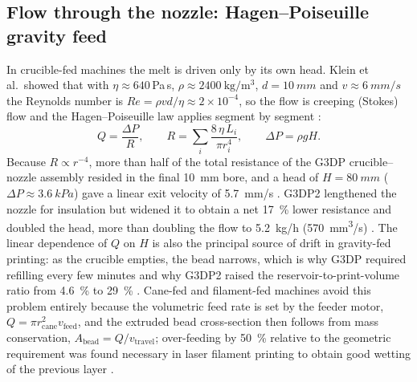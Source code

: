\subsection{Flow through the nozzle: Hagen--Poiseuille gravity feed}
In crucible-fed machines the melt is driven only by its own head. Klein et al.\ showed that with \(\eta \approx 640\,\)Pa\,s, \(\rho \approx \SI{2400}{\kilogram\per\cubic\metre}\), \(d = \SI{10}{mm}\) and \(v \approx \SI{6}{mm/s}\) the Reynolds number is \(Re = \rho v d/\eta \approx 2\times10^{-4}\), so the flow is creeping (Stokes) flow and the Hagen--Poiseuille law applies segment by segment \citep{klein2015,inamura2018}:
\begin{equation}
  Q = \frac{\Delta P}{R}, \qquad R = \sum_i \frac{8\,\eta\, L_i}{\pi r_i^{4}}, \qquad \Delta P = \rho g H .
  \label{eq:hp}
\end{equation}
Because \(R \propto r^{-4}\), more than half of the total resistance of the G3DP crucible--nozzle assembly resided in the final \SI{10}{mm} bore, and a head of \(H = \SI{80}{mm}\) (\(\Delta P \approx \SI{3.6}{kPa}\)) gave a linear exit velocity of \SI{5.7}{mm/s} \citep{klein2015}. G3DP2 lengthened the nozzle for insulation but widened it to obtain a net \SI{17}{\percent} lower resistance and doubled the head, more than doubling the flow to \SI{5.2}{kg/h} (\SI{570}{mm^3/s}) \citep{inamura2018}. The linear dependence of \(Q\) on \(H\) is also the principal source of drift in gravity-fed printing: as the crucible empties, the bead narrows, which is why G3DP required refilling every few minutes and why G3DP2 raised the reservoir-to-print-volume ratio from \SI{4.6}{\percent} to \SI{29}{\percent} \citep{inamura2018}. Cane-fed and filament-fed machines avoid this problem entirely because the volumetric feed rate is set by the feeder motor, \(Q = \pi r_{\mathrm{cane}}^{2} v_{\mathrm{feed}}\), and the extruded bead cross-section then follows from mass conservation, \(A_{\mathrm{bead}} = Q / v_{\mathrm{travel}}\); over-feeding by \SI{50}{\percent} relative to the geometric requirement was found necessary in laser filament printing to obtain good wetting of the previous layer \citep{kth2022bonding}.

